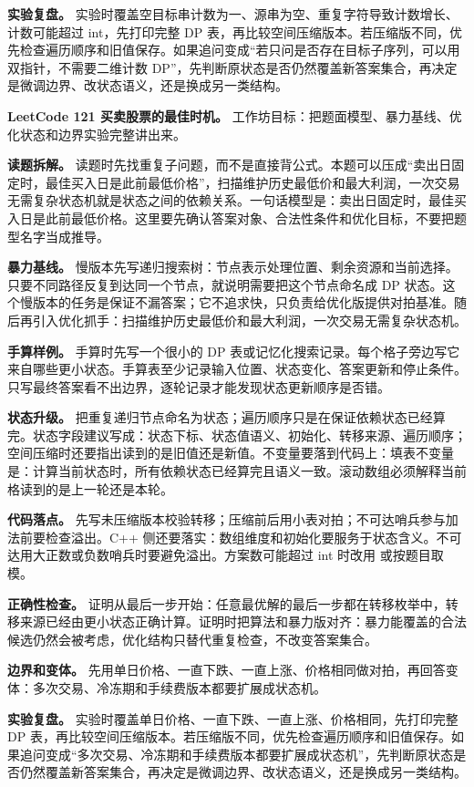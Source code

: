 \textbf{实验复盘。} 实验时覆盖空目标串计数为一、源串为空、重复字符导致计数增长、计数可能超过 int，先打印完整 DP 表，再比较空间压缩版本。若压缩版不同，优先检查遍历顺序和旧值保存。如果追问变成“若只问是否存在目标子序列，可以用双指针，不需要二维计数 DP”，先判断原状态是否仍然覆盖新答案集合，再决定是微调边界、改状态语义，还是换成另一类结构。

\noindent\textbf{LeetCode 121 买卖股票的最佳时机。} 工作坊目标：把题面模型、暴力基线、优化状态和边界实验完整讲出来。

\textbf{读题拆解。} 读题时先找重复子问题，而不是直接背公式。本题可以压成“卖出日固定时，最佳买入日是此前最低价格”，扫描维护历史最低价和最大利润，一次交易无需复杂状态机就是状态之间的依赖关系。一句话模型是：卖出日固定时，最佳买入日是此前最低价格。这里要先确认答案对象、合法性条件和优化目标，不要把题型名字当成推导。

\textbf{暴力基线。} 慢版本先写递归搜索树：节点表示处理位置、剩余资源和当前选择。只要不同路径反复到达同一个节点，就说明需要把这个节点命名成 DP 状态。这个慢版本的任务是保证不漏答案；它不追求快，只负责给优化版提供对拍基准。随后再引入优化抓手：扫描维护历史最低价和最大利润，一次交易无需复杂状态机。

\textbf{手算样例。} 手算时先写一个很小的 DP 表或记忆化搜索记录。每个格子旁边写它来自哪些更小状态。手算表至少记录输入位置、状态变化、答案更新和停止条件。只写最终答案看不出边界，逐轮记录才能发现状态更新顺序是否错。

\textbf{状态升级。} 把重复递归节点命名为状态；遍历顺序只是在保证依赖状态已经算完。状态字段建议写成：状态下标、状态值语义、初始化、转移来源、遍历顺序；空间压缩时还要指出读到的是旧值还是新值。不变量要落到代码上：填表不变量是：计算当前状态时，所有依赖状态已经算完且语义一致。滚动数组必须解释当前格读到的是上一轮还是本轮。

\textbf{代码落点。} 先写未压缩版本校验转移；压缩前后用小表对拍；不可达哨兵参与加法前要检查溢出。C++ 侧还要落实：数组维度和初始化要服务于状态含义。不可达用大正数或负数哨兵时要避免溢出。方案数可能超过 int 时改用  或按题目取模。

\textbf{正确性检查。} 证明从最后一步开始：任意最优解的最后一步都在转移枚举中，转移来源已经由更小状态正确计算。证明时把算法和暴力版对齐：暴力能覆盖的合法候选仍然会被考虑，优化结构只替代重复检查，不改变答案集合。

\textbf{边界和变体。} 先用单日价格、一直下跌、一直上涨、价格相同做对拍，再回答变体：多次交易、冷冻期和手续费版本都要扩展成状态机。

\textbf{实验复盘。} 实验时覆盖单日价格、一直下跌、一直上涨、价格相同，先打印完整 DP 表，再比较空间压缩版本。若压缩版不同，优先检查遍历顺序和旧值保存。如果追问变成“多次交易、冷冻期和手续费版本都要扩展成状态机”，先判断原状态是否仍然覆盖新答案集合，再决定是微调边界、改状态语义，还是换成另一类结构。


